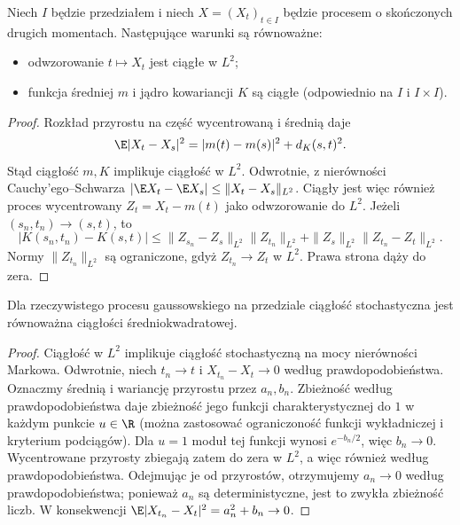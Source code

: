 \begin{stwierdzenie}
\label{prop:gauss-ms-continuity}
Niech $I$ będzie przedziałem i niech $X=(X_t)_{t\in I}$
będzie procesem o skończonych drugich momentach.
Następujące warunki są równoważne:
\begin{itemize}
\item odwzorowanie $t\mapsto X_t$ jest ciągłe w $L^2$;
\item funkcja średniej $m$ i jądro kowariancji $K$
są ciągłe (odpowiednio na $I$ i $I\times I$).
\end{itemize}
\end{stwierdzenie}
\begin{proof}
Rozkład przyrostu na część wycentrowaną i średnią daje
\[
\E|X_t-X_s|^2=|m(t)-m(s)|^2+d_K(s,t)^2.
\]
Stąd ciągłość $m,K$ implikuje ciągłość w $L^2$.
Odwrotnie, z nierówności Cauchy'ego--Schwarza
$|\E X_t-\E X_s|\le\|X_t-X_s\|_{L^2}$.
Ciągły jest więc również proces wycentrowany
$Z_t=X_t-m(t)$ jako odwzorowanie do $L^2$.
Jeżeli $(s_n,t_n)\to(s,t)$, to
\[
|K(s_n,t_n)-K(s,t)|
\le\|Z_{s_n}-Z_s\|_{L^2}\|Z_{t_n}\|_{L^2}
+\|Z_s\|_{L^2}\|Z_{t_n}-Z_t\|_{L^2}.
\]
Normy $\|Z_{t_n}\|_{L^2}$ są ograniczone, gdyż
$Z_{t_n}\to Z_t$ w $L^2$. Prawa strona dąży do zera.
\end{proof}

\begin{wniosek}
Dla rzeczywistego procesu gaussowskiego na przedziale
ciągłość stochastyczna jest równoważna ciągłości
średniokwadratowej.
\end{wniosek}
\begin{proof}
Ciągłość w $L^2$ implikuje ciągłość stochastyczną
na mocy nierówności Markowa. Odwrotnie, niech
$t_n\to t$ i $X_{t_n}-X_t\to0$ według prawdopodobieństwa.
Oznaczmy średnią i wariancję przyrostu przez $a_n,b_n$.
Zbieżność według prawdopodobieństwa daje zbieżność
jego funkcji charakterystycznej do $1$ w każdym
punkcie $u\in\R$ (można zastosować ograniczoność
funkcji wykładniczej i kryterium podciągów).
Dla $u=1$ moduł tej funkcji wynosi $e^{-b_n/2}$,
więc $b_n\to0$. Wycentrowane przyrosty zbiegają
zatem do zera w $L^2$, a więc również według
prawdopodobieństwa. Odejmując je od przyrostów,
otrzymujemy $a_n\to0$ według prawdopodobieństwa;
ponieważ $a_n$ są deterministyczne, jest to
zwykła zbieżność liczb. W konsekwencji
$\E|X_{t_n}-X_t|^2=a_n^2+b_n\to0$.
\end{proof}

